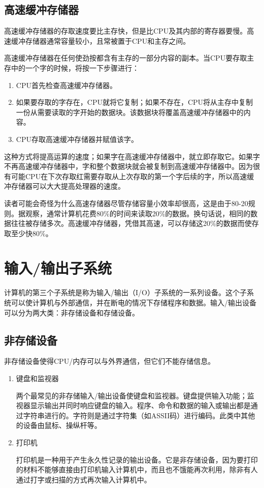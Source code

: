 \subsection{高速缓冲存储器}
高速缓冲存储器的存取速度要比主存快，但是比CPU及其内部的寄存器要慢。高速缓冲存储器通常容量较小，且常被置于CPU和主存之间。

高速缓冲存储器在任何使劲按都含有主存的一部分内容的副本。当CPU要存取主存中的一个字的时候，将按一下步骤进行：
\begin{enumerate}
	\item CPU首先检查高速缓冲存储器。
	\item 如果要存取的字存在，CPU就将它复制；如果不存在，CPU将从主存中复制一份从需要读取的字开始的数据块。该数据块将覆盖高速缓冲存储器中的内容。
	\item CPU存取高速缓冲存储器并赋值该字。
\end{enumerate}
这种方式将提高运算的速度；如果字在高速缓冲存储器中，就立即存取它。如果字不再高速缓冲存储器中，字和整个数据块就会被复制到高速缓冲存储器中。因为很有可能CPU在下次存取红需要存取从上次存取的第一个字后续的字，所以高速缓冲存储器可以大大提高处理器的速度。

读者可能会奇怪为什么高速存储器尽管存储容量小效率却很高，这是由于80-20规则。据观察，通常计算机花费80\%的时间来读取20\%的数据。换句话说，相同的数据往往被存储多次。高速缓冲存储器，凭借其高速，可以存储这20\%的数据而使存取至少快80\%。
\section{输入/输出子系统}
计算机的第三个子系统是称为输入/输出（I/O）子系统的一系列设备。这个子系统可以使计算机与外部通信，并在断电的情况下存储程序和数据。输入/输出设备可以分为两大类：非存储设备和存储设备。
\subsection{非存储设备}
非存储设备使得CPU/内存可以与外界通信，但它们不能存储信息。
\begin{enumerate}
	\item 键盘和监视器

	两个最常见的非存储输入/输出设备使键盘和监视器。键盘提供输入功能；监视器显示输出并同时响应键盘的输入。程序、命令和数据的输入或输出都是通过字符串进行的。字符则是通过字符集（如ASSII码）进行编码。此类中其他的设备由鼠标、操纵杆等。
	\item 打印机

	打印机是一种用于产生永久性记录的输出设备。它是非存储设备，因为要打印的材料不能够直接由打印机输入计算机中，而且也不饿能再次利用，除非有人通过打字或扫描的方式再次输入计算机中。
\end{enumerate}
